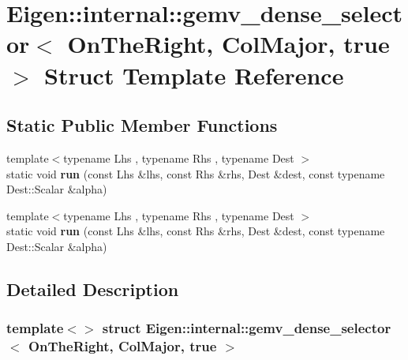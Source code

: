 \hypertarget{struct_eigen_1_1internal_1_1gemv__dense__selector_3_01_on_the_right_00_01_col_major_00_01true_01_4}{}\section{Eigen\+:\+:internal\+:\+:gemv\+\_\+dense\+\_\+selector$<$ On\+The\+Right, Col\+Major, true $>$ Struct Template Reference}
\label{struct_eigen_1_1internal_1_1gemv__dense__selector_3_01_on_the_right_00_01_col_major_00_01true_01_4}
\subsection*{Static Public Member Functions}
\begin{DoxyCompactItemize}
\item 
\mbox{\label{struct_eigen_1_1internal_1_1gemv__dense__selector_3_01_on_the_right_00_01_col_major_00_01true_01_4_ace6cd972a53e1d029ee4a9e32ff68795}} 
{\footnotesize template$<$typename Lhs , typename Rhs , typename Dest $>$ }\\static void {\bfseries run} (const Lhs \&lhs, const Rhs \&rhs, Dest \&dest, const typename Dest\+::\+Scalar \&alpha)
\item 
\mbox{\label{struct_eigen_1_1internal_1_1gemv__dense__selector_3_01_on_the_right_00_01_col_major_00_01true_01_4_ace6cd972a53e1d029ee4a9e32ff68795}} 
{\footnotesize template$<$typename Lhs , typename Rhs , typename Dest $>$ }\\static void {\bfseries run} (const Lhs \&lhs, const Rhs \&rhs, Dest \&dest, const typename Dest\+::\+Scalar \&alpha)
\end{DoxyCompactItemize}


\subsection{Detailed Description}
\subsubsection*{template$<$$>$\newline
struct Eigen\+::internal\+::gemv\+\_\+dense\+\_\+selector$<$ On\+The\+Right, Col\+Major, true $>$}



